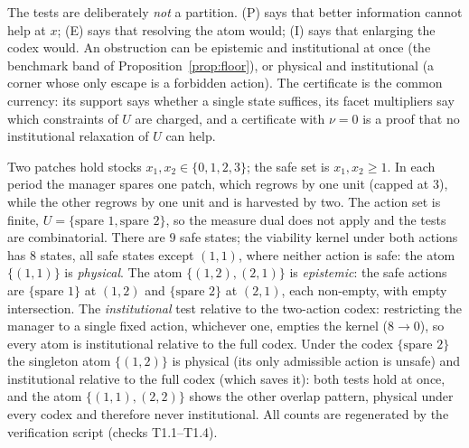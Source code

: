 The tests are deliberately \emph{not} a partition. (P) says that better information cannot help at $x$; (E) says that resolving the atom would; (I) says that enlarging the codex would. An obstruction can be epistemic and institutional at once (the benchmark band of Proposition~\ref{prop:floor}), or physical and institutional (a corner whose only escape is a forbidden action). The certificate is the common currency: its support says whether a single state suffices, its facet multipliers say which constraints of $U$ are charged, and a certificate with $\nu=0$ is a proof that no institutional relaxation of $U$ can help.

\begin{example}\label{ex:patch}
Two patches hold stocks $x_1,x_2\in\{0,1,2,3\}$; the safe set is $x_1,x_2\ge1$. In each period the manager spares one patch, which regrows by one unit (capped at $3$), while the other regrows by one unit and is harvested by two. The action set is finite, $U=\{\text{spare }1,\text{spare }2\}$, so the measure dual does not apply and the tests are combinatorial. There are $9$ safe states; the viability kernel under both actions has $8$ states, all safe states except $(1,1)$, where neither action is safe: the atom $\{(1,1)\}$ is \emph{physical}. The atom $\{(1,2),(2,1)\}$ is \emph{epistemic}: the safe actions are $\{\text{spare }1\}$ at $(1,2)$ and $\{\text{spare }2\}$ at $(2,1)$, each non-empty, with empty intersection. The \emph{institutional} test relative to the two-action codex: restricting the manager to a single fixed action, whichever one, empties the kernel ($8\to0$), so every atom is institutional relative to the full codex. Under the codex $\{\text{spare }2\}$ the singleton atom $\{(1,2)\}$ is physical (its only admissible action is unsafe) and institutional relative to the full codex (which saves it): both tests hold at once, and the atom $\{(1,1),(2,2)\}$ shows the other overlap pattern, physical under every codex and therefore never institutional. All counts are regenerated by the verification script (checks T1.1--T1.4).
\end{example}
